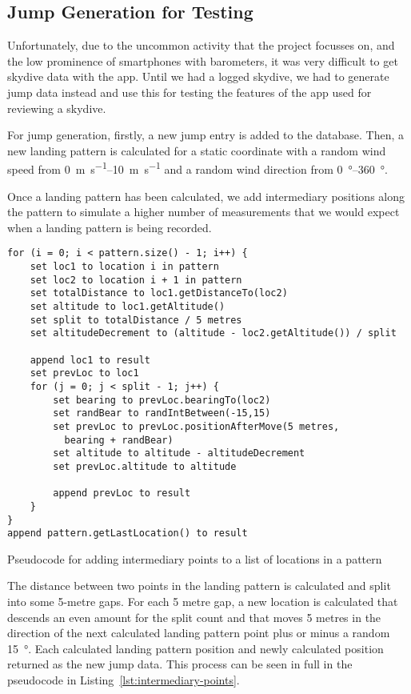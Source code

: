 \subsection{Jump Generation for Testing}
Unfortunately, due to the uncommon activity that the project focusses on, and the low prominence of smartphones with barometers, it was very difficult to get skydive data with the app. Until we had a logged skydive, we had to generate jump data instead and use this for testing the features of the app used for reviewing a skydive.

For jump generation, firstly, a new jump entry is added to the database. Then, a new landing pattern is calculated for a static coordinate with a random wind speed from \SIrange{0}{10}{\metre\per\second} and a random wind direction from \SIrange{0}{360}{\degree}.

Once a landing pattern has been calculated, we add intermediary positions along the pattern to simulate a higher number of measurements that we would expect when a landing pattern is being recorded.

\begin{listing}
  \centering
  \begin{lstlisting}[style=code]
for (i = 0; i < pattern.size() - 1; i++) {
    set loc1 to location i in pattern
    set loc2 to location i + 1 in pattern
    set totalDistance to loc1.getDistanceTo(loc2)
    set altitude to loc1.getAltitude()
    set split to totalDistance / 5 metres
    set altitudeDecrement to (altitude - loc2.getAltitude()) / split

    append loc1 to result
    set prevLoc to loc1
    for (j = 0; j < split - 1; j++) {
        set bearing to prevLoc.bearingTo(loc2)
        set randBear to randIntBetween(-15,15)
        set prevLoc to prevLoc.positionAfterMove(5 metres,
          bearing + randBear)
        set altitude to altitude - altitudeDecrement
        set prevLoc.altitude to altitude

        append prevLoc to result
    }
}
append pattern.getLastLocation() to result
  \end{lstlisting}
  \caption{Pseudocode for adding intermediary points to a list of locations in a pattern}\label{lst:intermediary-points}
\end{listing}

The distance between two points in the landing pattern is calculated and split into some 5-metre gaps. For each 5 metre gap, a new location is calculated that descends an even amount for the split count and that moves 5 metres in the direction of the next calculated landing pattern point plus or minus a random \SI{15}{\degree}. Each calculated landing pattern position and newly calculated position returned as the new jump data. This process can be seen in full in the pseudocode in Listing~\vref{lst:intermediary-points}.

